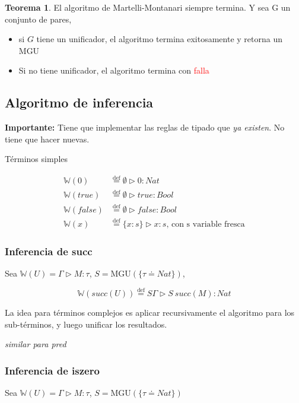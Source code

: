 \documentclass{report}
\theoremstyle{definition} %
\newtheorem{theorem}{Teorema}[chapter]
\newcommand{\eqdef}{\overset{\text{def}}{=}}
\newcommand{\tipa}[3]{#1 \rhd #2 : #3} %
\newcommand{\Gtipa}[2]{\tipa{\Gamma}{#1}{#2}}
\newcommand{\suc}[1]{succ(#1)}
\newcommand{\changed}[1]{\textcolor{Red}{#1}}
\newcommand{\tsust}[1]{S#1} %
\newcommand{\infer}[1]{\mathbb{W}(#1)}
\newcommand{\tcontextOne}[2]{\{ #1 : #2 \}} %
\newcommand{\etipa}[2]{\tipa{\emptyset}{#1}{#2}} %
\newcommand{\unify}[2]{#1 \doteq #2}
\newcommand{\mgu}[2]{\text{MGU}(\{ \unify{#1}{#2} \})}
\begin{document}
\begin{theorem}
    El algoritmo de Martelli-Montanari siempre termina. Y sea G un conjunto de
    pares,
    
    \begin{itemize}
        \item si $G$ tiene un unificador, el algoritmo termina exitosamente y
        retorna un MGU
        \item Si no tiene unificador, el algoritmo termina con \changed{falla}
    \end{itemize} 
\end{theorem}

\subsection{Algoritmo de inferencia}

\textbf{Importante:} Tiene que implementar las reglas de tipado que \textit{ya
existen}. No tiene que hacer nuevas.

Términos simples

\begin{align*}
    \infer{0} &\eqdef \etipa{0}{Nat}\\
    \infer{true} &\eqdef \etipa{true}{Bool}\\
    \infer{false} &\eqdef \etipa{false}{Bool}\\
    \infer{x} &\eqdef \tipa{\tcontextOne{x}{s}}{x}{s}
    \text{, con s variable fresca}
\end{align*}

\subsubsection{Inferencia de succ}

Sea $\infer{U} = \Gtipa{M}{\tau}$, $S = \mgu{\tau}{Nat}$,

$$\infer{\suc{U}} \eqdef \tipa{\tsust{\Gamma}}{\tsust{\ \suc{M}}}{Nat}$$

La idea para términos complejos es aplicar recursivamente el algoritmo para los
sub-términos, y luego unificar los resultados.

\textit{similar para pred}

\subsubsection{Inferencia de iszero}

Sea $\infer{U} = \Gtipa{M}{\tau}$, $S = \mgu{\tau}{Nat}$
\end{document}

